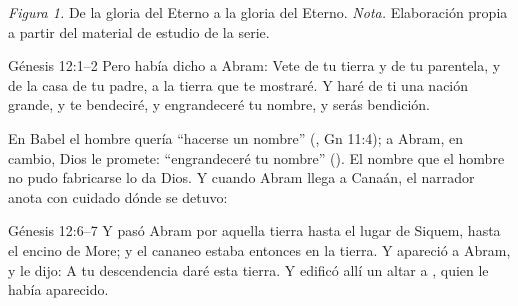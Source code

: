 \begin{center}
\par
{\footnotesize\color{gris}\textit{Figura 1.} De la gloria del Eterno a la gloria del Eterno. \textit{Nota.} Elaboración propia a partir del material de estudio de la serie.}
\end{center}

\begin{verso}{Génesis 12:1–2}
Pero \SENOR{} había dicho a Abram: Vete de tu tierra y de tu parentela, y de la casa de tu padre, a la tierra que te mostraré. Y haré de ti una nación grande, y te bendeciré, y engrandeceré tu nombre, y serás bendición.
\end{verso}

En Babel el hombre quería ``hacerse un nombre'' (, Gn 11:4); a Abram, en cambio, Dios le promete: ``engrandeceré tu nombre'' (). El nombre que el hombre no pudo fabricarse lo da Dios. Y cuando Abram llega a Canaán, el narrador anota con cuidado dónde se detuvo:

\begin{verso}{Génesis 12:6–7}
Y pasó Abram por aquella tierra hasta el lugar de Siquem, hasta el encino de More; y el cananeo estaba entonces en la tierra. Y apareció \SENOR{} a Abram, y le dijo: A tu descendencia daré esta tierra. Y edificó allí un altar a \SENOR, quien le había aparecido.
\end{verso}


